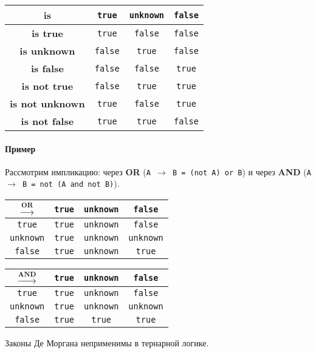 \begin{center}
	\begin{tabular}{|c||c|c|c|}
		\hline
		\textbf{is}             & \texttt{true}  & \texttt{unknown} & \texttt{false} \\
		\hline
		\hline
		\textbf{is true}        & \texttt{true}  & \texttt{false}   & \texttt{false} \\
		\hline
		\textbf{is unknown}     & \texttt{false} & \texttt{true}    & \texttt{false} \\
		\hline
		\textbf{is false}       & \texttt{false} & \texttt{false}   & \texttt{true}  \\
		\hline
		\textbf{is not true}    & \texttt{false} & \texttt{true}    & \texttt{true}  \\
		\hline
		\textbf{is not unknown} & \texttt{true}  & \texttt{false}   & \texttt{true}  \\
		\hline
		\textbf{is not false}   & \texttt{true}  & \texttt{true}    & \texttt{false} \\
		\hline
	\end{tabular}
\end{center}

\paragraph{Пример}

Рассмотрим импликацию: через \textbf{OR} (\texttt{A $\rightarrow$ B = (not A) or B}) и через \textbf{AND} (\texttt{A $\rightarrow$ B = not (A and not B)}).

\begin{center}
	\begin{tabular}{|c||c|c|c|}
		\hline
		$\xrightarrow{\textbf{OR}}$ & \texttt{true} & \texttt{unknown} & \texttt{false}   \\
		\hline
		\hline
		\texttt{true}               & \texttt{true} & \texttt{unknown} & \texttt{false}   \\
		\hline
		\texttt{unknown}            & \texttt{true} & \texttt{unknown} & \texttt{unknown} \\
		\hline
		\texttt{false}              & \texttt{true} & \texttt{unknown} & \texttt{true}    \\
		\hline
	\end{tabular}
\end{center}

\begin{center}
	\begin{tabular}{|c||c|c|c|}
		\hline
		$\xrightarrow{\textbf{AND}}$ & \texttt{true} & \texttt{unknown} & \texttt{false}   \\
		\hline
		\hline
		\texttt{true}                & \texttt{true} & \texttt{unknown} & \texttt{false}   \\
		\hline
		\texttt{unknown}             & \texttt{true} & \texttt{unknown} & \texttt{unknown} \\
		\hline
		\texttt{false}               & \texttt{true} & \texttt{true}    & \texttt{true}    \\
		\hline
	\end{tabular}
\end{center}

\begin{proposition}
	Законы Де Моргана неприменимы в тернарной логике.
\end{proposition}
